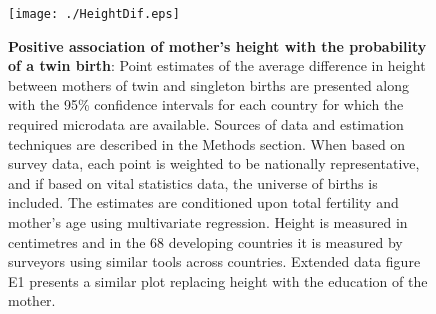\documentclass{nature}
\begin{document}
\begin{linenumbers}

\clearpage
\thispagestyle{empty}

\clearpage

\begin{spacing}{1}
\begin{figure}[htpb!]
  \texttt{[image: ./HeightDif.eps]}
\vspace{5mm}
\caption{\textbf{Positive association of mother's height with the probability of a twin birth}: {\footnotesize Point estimates of the average difference in height between mothers of twin and singleton births are presented along with the 95\% confidence intervals for each country for which the required microdata are available. Sources of data and estimation techniques are described in the Methods section. When based on survey data, each point is weighted to be nationally representative, and if based on vital statistics data, the universe of births is included. The estimates are conditioned upon total fertility and mother's age using multivariate regression. Height is measured in centimetres and in the 68 developing countries it is measured by surveyors using similar tools across countries. Extended data figure E1 presents a similar plot replacing height with the education of the mother.}}
\label{fig:countryEsts}
\end{figure}



\end{spacing}
\end{linenumbers}
\end{document}

